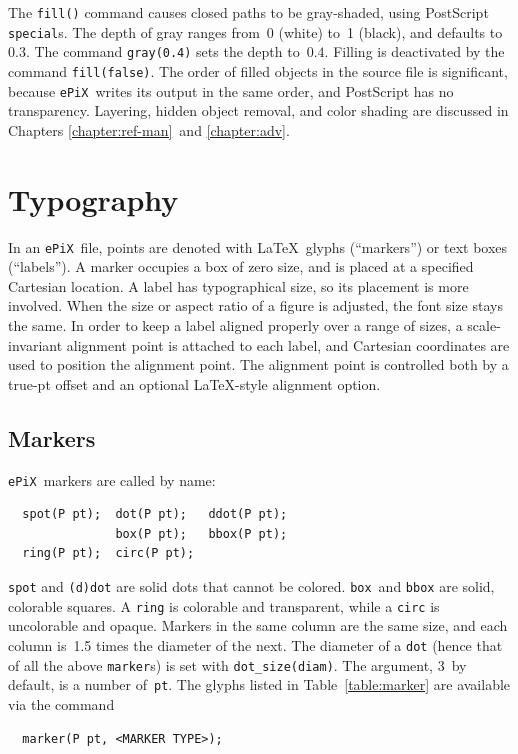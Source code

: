 \documentclass[12pt]{report}
\newcommand{\code}[1]{\texttt{#1}}
\newcommand{\ePiX}{\code{ePiX}}
\begin{document}
The \code{fill()} command causes closed paths to be gray-shaded, using
Post\-Script \code{special}s. The depth of gray ranges from~0 (white)
to~1 (black), and defaults to~$0.3$. The command \code{gray(0.4)} sets
the depth to~$0.4$.  Filling is deactivated by the command
\code{fill(false)}. The order of filled objects in the source file is
significant, because \ePiX\ writes its output in the same order, and
PostScript has no transparency. Layering, hidden object removal, and
color shading are discussed in Chapters \ref{chapter:ref-man}~and
\ref{chapter:adv}.


\section{Typography}

In an \ePiX\ file, points are denoted with \LaTeX\ glyphs
(``markers'') or text boxes (``labels''). A marker occupies a box of
zero size, and is placed at a specified Cartesian location. A label
has typographical size, so its placement is more involved.  When the
size or aspect ratio of a figure is adjusted, the
font size stays the same. In order to keep a label aligned properly
over a range of sizes, a scale-invariant alignment point is attached
to each label, and Cartesian coordinates are used to position the
alignment point. The alignment point is controlled both by a true-pt
offset and an optional \LaTeX-style alignment option.


\subsection*{Markers}

 \ePiX\ markers are called
by name: 
\begin{verbatim}
  spot(P pt);  dot(P pt);   ddot(P pt);
               box(P pt);   bbox(P pt);  
  ring(P pt);  circ(P pt);
\end{verbatim}
\code{spot} and \code{(d)dot} are solid dots that cannot be colored.
\code{box}~and \code{bbox} are solid, colorable squares.  A
\code{ring} is colorable and transparent, while a \code{circ} is
uncolorable and opaque. Markers in the same column are the same size,
and each column is~1.5 times the diameter of the next. The diameter of
a \code{dot} (hence that of all the above \code{marker}s) is set with
\code{dot\_size(diam)}. The argument, 3~by default, is a number
of~\code{pt}.  The glyphs listed in Table~\ref{table:marker} are
available via the command
\begin{verbatim}
  marker(P pt, <MARKER TYPE>);
\end{verbatim}
\begin{table}[tb]
  \begin{center}
    
  \end{center}
  \caption{\ePiX's \code{marker} types.}
  \label{table:marker}
\end{table}
\end{document}
